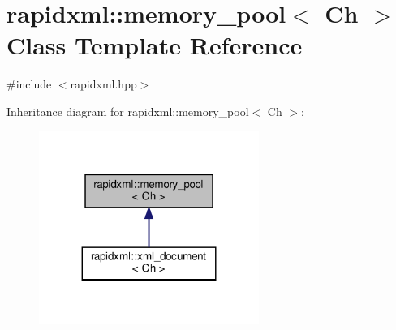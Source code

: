\hypertarget{classrapidxml_1_1memory__pool}{}\section{rapidxml\+:\+:memory\+\_\+pool$<$ Ch $>$ Class Template Reference}
\label{classrapidxml_1_1memory__pool}


{\ttfamily \#include $<$rapidxml.\+hpp$>$}



Inheritance diagram for rapidxml\+:\+:memory\+\_\+pool$<$ Ch $>$\+:
\nopagebreak
\begin{figure}[H]
\begin{center}
\leavevmode
\includegraphics[width=203pt]{classrapidxml_1_1memory__pool__inherit__graph}
\end{center}
\end{figure}
